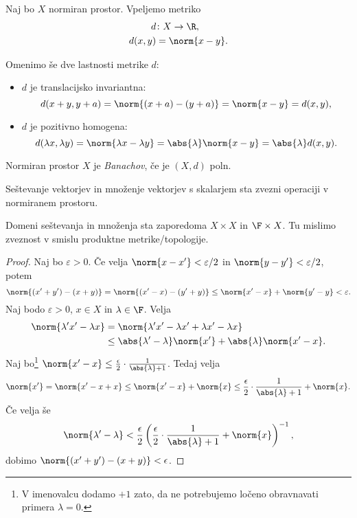 Naj bo $X$ normiran prostor. Vpeljemo metriko
\begin{align*}
    d &\colon X \to \R, \\
    d(x,y) &= \norm{x-y}.
\end{align*}

Omenimo še dve lastnosti metrike $d$:
\begin{itemize}
    \item $d$ je translacijsko invariantna:
    \[
        d(x+y,y+a) = \norm{(x+a) - (y+a)} = \norm{x-y} = d(x,y),
    \]
    \item $d$ je pozitivno homogena:
    \[
        d(\lambda x, \lambda y) = \norm{\lambda x - \lambda y} = 
        \abs{\lambda} \norm{x-y} = \abs{\lambda}d(x,y).
    \]
\end{itemize}

\begin{definicija}
    Normiran prostor $X$ je \emph{Banachov}, če je $(X, d)$ poln.
\end{definicija}

\begin{trditev}
    Seštevanje vektorjev in množenje vektorjev s skalarjem sta zvezni operaciji 
    v normiranem prostoru.
\end{trditev}
Domeni seštevanja in množenja sta zaporedoma $X \times X$ in $\F \times X$. Tu mislimo 
zveznost v smislu produktne metrike/topologije.

\begin{proof}
    Naj bo $\varepsilon > 0$. Če velja $\norm{x-x'} < \varepsilon/2$ in 
    $\norm{y-y'} < \varepsilon/2$, potem
    \[
        \norm{(x'+y') - (x+y)} = \norm{(x'-x) - (y'+y)} \le \norm{x'-x} 
        + \norm{y'-y} < \varepsilon.
    \]
    Naj bodo $\varepsilon > 0$, $x \in X$ in $\lambda \in \F$. Velja
    \begin{align*}
        \norm{\lambda' x' - \lambda x} &= \norm{\lambda'x' -\lambda x' + \lambda x' - \lambda x} \\
        &\le \abs{\lambda'-\lambda} \norm{x'} + \abs{\lambda} \norm{x'-x}.
    \end{align*}
    Naj bo\footnote{V imenovalcu dodamo $+1$ zato, da ne potrebujemo ločeno obravnavati primera $\lambda = 0$.} 
    $\norm{x'-x} \le \frac{\epsilon}{2} \cdot \frac{1}{\abs{\lambda} + 1}$. Tedaj velja
    \[
        \norm{x'} = \norm{x' -x +x} \le \norm{x'-x}+ \norm{x} \le \frac{\epsilon}{2} \cdot \frac{1}{\abs{\lambda} + 1} + \norm{x}.
    \]
    Če velja še
    \[
        \norm{\lambda' - \lambda} < \frac{\epsilon}{2} 
        \left(\frac{\epsilon}{2} \cdot \frac{1}{\abs{\lambda} + 1} + \norm{x}\right)^{-1},
    \]
    dobimo $\norm{(x'+y') - (x+y)} < \epsilon$.
\end{proof}